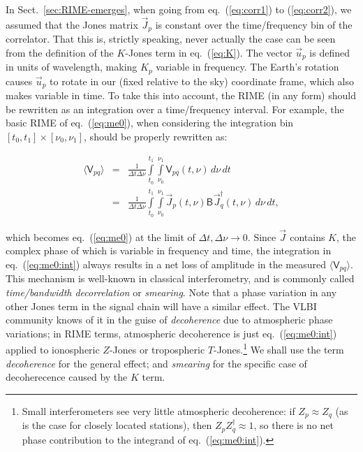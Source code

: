 \documentclass[]{aa}
\newcommand{\jones}[2]{\vec {#1}_{#2}}
\newcommand{\jonesT}[2]{\vec {#1}^\dagger_{#2}}
\newcommand{\coh}[2]{\mathsf{{#1}}_{{#2}}}
\begin{document}
In Sect.~\ref{sec:RIME-emerges}, when going from eq.~(\ref{eq:corr1}) to (\ref{eq:corr2}), we assumed that the Jones matrix $\jones{J}{p}$ is constant over the time/frequency bin of the correlator. That this is, strictly speaking, never actually the case can be seen from the definition of the $K$-Jones term in eq.~(\ref{eq:K}). The vector $\vec u_p$ is defined in units of wavelength, making $K_p$ variable in frequency. The Earth's rotation causes $\vec u_p$ to rotate in our (fixed relative to the sky) coordinate frame, which also makes variable in time. To take this into account, the RIME (in any form) should be rewritten as an integration over a time/frequency interval. For example, the basic RIME of eq.~(\ref{eq:me0}), when considering the integration bin $[t_0,t_1]\times[\nu_0,\nu_1]$, should be properly rewritten as:

\begin{eqnarray}
\langle \coh{V}{pq} \rangle & = & \frac{1}{\Delta t\Delta\nu}\int\limits^{t_1}_{t_0} \int\limits^{\nu_1}_{\nu_0} \coh{V}{pq}(t,\nu)\,d\nu\,dt \nonumber \\
\label{eq:me0:int}
& = & \frac{1}{\Delta t\Delta\nu}\int\limits^{t_1}_{t_0} \int\limits^{\nu_1}_{\nu_0} \jones{J}{p} (t,\nu) \coh{B}{}  \jonesT{J}{q}(t,\nu) \, d\nu\,dt,
\end{eqnarray}

which becomes eq.~(\ref{eq:me0}) at the limit of $\Delta t,\Delta\nu \to 0$. Since $\jones{J}{}$ contains $K$, the complex phase of which is variable in frequency and time, the integration in eq.~(\ref{eq:me0:int}) always results in a net loss of amplitude in the measured $\langle \coh{V}{pq} \rangle $. This mechanism is well-known in classical interferometry, and is commonly called {\em time/bandwidth decorrelation} or {\em smearing}. Note that a phase variation in any other Jones term in the signal chain will have a similar effect. The VLBI community knows of it in the guise of {\em decoherence} due to atmospheric phase variations; in RIME terms, atmospheric decoherence is just eq.~(\ref{eq:me0:int}) applied to ionospheric $Z$-Jones or tropospheric $T$-Jones.\footnote{Small interferometers see very little atmospheric decoherence: if $Z_p\approx Z_q$ (as is the case for closely located stations), then $Z_p Z^\dagger_q \approx 1$, so there is no net phase contribution to the integrand of eq.~(\ref{eq:me0:int}).} We shall use the term {\em decoherence} for the general effect; and {\em smearing} for the specific case of decoherecence caused by the $K$ term.
\end{document}

